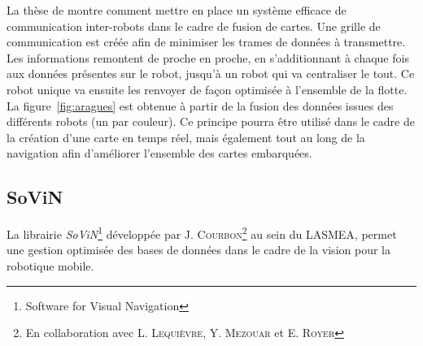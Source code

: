 La thèse de \citeauthor{Aragues11PhD} \cite{Aragues11PhD} montre comment mettre en place un système efficace de communication inter-robots dans le cadre de fusion de cartes.
Une grille de communication est créée afin de minimiser les trames de données à transmettre.
Les informations remontent de proche en proche, en s'additionnant à chaque fois aux données présentes sur le robot, jusqu'à un robot qui va centraliser le tout.
Ce robot unique va ensuite les renvoyer de façon optimisée à l'ensemble de la flotte.
La figure~\ref{fig:aragues} est obtenue à partir de la fusion des données issues des différents robots (un par couleur).
Ce principe pourra être utilisé dans le cadre de la création d'une carte en temps réel, mais également tout au long de la navigation afin d'améliorer l'ensemble des cartes embarquées.



\subsection{SoViN}
\label{subsub:sovin}

       
La librairie \emph{SoViN}\footnote{Software for Visual Navigation} développée par J. \textsc{Courbon}\footnote{En collaboration avec L. \textsc{Lequièvre}, Y. \textsc{Mezouar} et E. \textsc{Royer}} au sein du LASMEA, permet une gestion optimisée des bases de données dans le cadre de la vision pour la robotique mobile.

